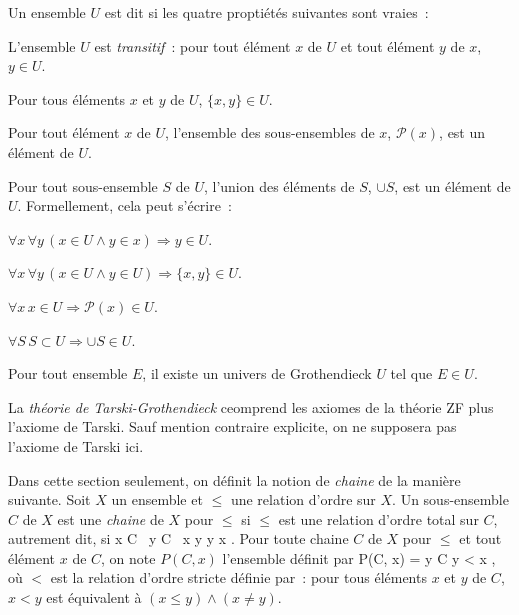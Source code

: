 \stopsubsection

\startsubsection[title={Théorie de Tarski-Grothendieck}]

\noindent{} Un ensemble $U$ est dit \emph{} si les quatre proptiétés suivantes sont vraies : 
\startitemize[nowhite]
    \item L'ensemble $U$ est \emph{transitif} : pour tout élément $x$ de $U$ et tout élément $y$ de $x$, $y \in U$.
    \item Pour tous éléments $x$ et $y$ de $U$, $\lbrace x, y \rbrace \in U$.
    \item Pour tout élément $x$ de $U$, l'ensemble des sous-ensembles de $x$, $\mathcal{P}(x)$, est un élément de $U$.
    \item Pour tout sous-ensemble $S$ de $U$, l'union des éléments de $S$, $\cup S$, est un élément de $U$.
\stopitemize
Formellement, cela peut s'écrire :
\startitemize[nowhite]
    \item $\forall x \, \forall y \, (x \in U \wedge y \in x) \Rightarrow y \in U$.
    \item $\forall x \, \forall y \, (x \in U \wedge y \in U) \Rightarrow \lbrace x, y \rbrace \in U$.
    \item $\forall x \, x \in U \Rightarrow \mathcal{P}(x) \in U$.
    \item $\forall S\, S \subset U \Rightarrow \cup S \in U$.
\stopitemize

\blank[medium]

\noindent\emph{} Pour tout ensemble $E$, il existe un univers de Grothendieck $U$ tel que $E \in U$.

\blank[medium]

La \emph{théorie de Tarski-Grothendieck} ceomprend les axiomes de la théorie ZF plus l'axiome de Tarski. 
Sauf mention contraire explicite, on ne supposera pas l'axiome de Tarski ici.

\stopsubsection

\startsubsection[title=Lemme de Zorn (en théorie ZFC)]

Dans cette section seulement, on définit la notion de \emph{chaine} de la manière suivante.
Soit $X$ un ensemble et $\leq$ une relation d'ordre sur $X$.
Un sous-ensemble $C$ de $X$ est une \emph{chaine} de $X$ pour $\leq$ si $\leq$ est une relation d'ordre total sur $C$, autrement dit, si
\startformula
    \forall x \in C \, \forall y \in C \, x \leq y \vee y \leq x .
\stopformula
Pour toute chaine $C$ de $X$ pour $\leq$ et tout élément $x$ de $C$, on note $P(C, x)$ l'ensemble définit par
\startformula
    P(C, x) = \lbrace y \in C \vert y < x \rbrace ,
\stopformula
où $<$ est la relation d'ordre stricte définie par : pour tous éléments $x$ et $y$ de $C$, $x < y$ est équivalent à $(x \leq y) \wedge (x \neq y)$.

